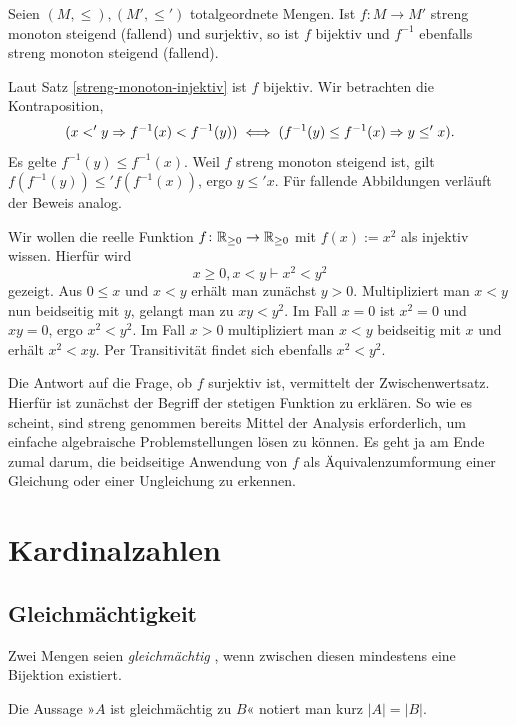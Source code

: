 \begin{Satz}
Seien $(M,\le),(M',\le')$ totalgeordnete Mengen. Ist $f\colon M\to M'$
streng monoton steigend (fallend) und surjektiv, so ist $f$ bijektiv und $f^{-1}$
ebenfalls streng monoton steigend (fallend).
\end{Satz}
\begin{Beweis}
Laut Satz \ref{streng-monoton-injektiv} ist $f$ bijektiv. Wir betrachten
die Kontraposition,
\[(x <' y \Rightarrow f^{-1}(x) < f^{-1}(y))\iff
(f^{-1}(y) \le f^{-1}(x)\Rightarrow y\le' x).\]
Es gelte $f^{-1}(y) \le f^{-1}(x)$. Weil $f$ streng monoton steigend
ist, gilt $f(f^{-1}(y))\le' f(f^{-1}(x))$, ergo $y\le' x$. Für fallende
Abbildungen verläuft der Beweis analog.\,\qedsymbol
\end{Beweis}

\noindent
{} Wir wollen die reelle Funktion $f\colon\mathbb R_{\ge 0}\to\mathbb R_{\ge 0}$
mit $f(x):=x^2$ als injektiv wissen. Hierfür wird
\[x\ge 0,x<y\vdash x^2<y^2\]
gezeigt. Aus $0\le x$ und $x<y$ erhält man zunächst $y>0$. Multipliziert man
$x<y$ nun beidseitig mit $y$, gelangt man zu $xy<y^2$. Im Fall $x=0$ ist
$x^2=0$ und $xy=0$, ergo $x^2<y^2$. Im Fall $x>0$ multipliziert man
$x<y$ beidseitig mit $x$ und erhält $x^2<xy$. Per Transitivität
findet sich ebenfalls $x^2<y^2$.

Die Antwort auf die Frage, ob $f$ surjektiv ist, vermittelt der
Zwischenwertsatz. Hierfür ist zunächst der Begriff der stetigen
Funktion zu erklären. So wie es scheint, sind streng genommen bereits
Mittel der Analysis erforderlich, um einfache algebraische
Problemstellungen lösen zu können. Es geht ja am Ende zumal darum, die
beidseitige Anwendung von $f$ als Äquivalenzumformung einer
Gleichung oder einer Ungleichung zu erkennen.

\newpage
\section{Kardinalzahlen}

\subsection{Gleichmächtigkeit}

\begin{Definition}[Gleichmächtigkeit]\newlinefirst
Zwei Mengen seien \emph{gleichmächtig}%
, wenn zwischen diesen
mindestens eine Bijektion existiert.
\end{Definition}
Die Aussage »$A$ ist gleichmächtig zu $B$« notiert man kurz $|A|=|B|$.

